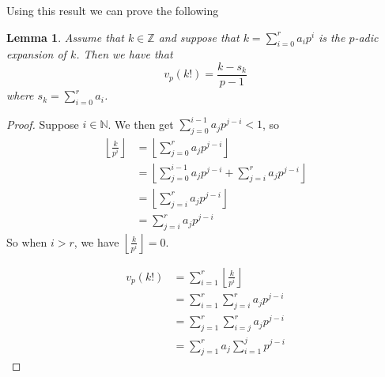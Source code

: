 \documentclass{article}
\newtheorem{lemma}{Lemma}[section]
\newcommand{\mbb}[1]{\mathbb{#1}}
\begin{document}
Using this result we can prove the following

\begin{lemma}
    Assume that $k \in \mbb Z$ and suppose that $k = \sum_{i = 0}^{r} a_i p^i$ is the $p$-adic expansion of $k$. Then we have that 
    $$v_p(k!) = \frac{k - s_k}{p - 1}$$
    where $s_k = \sum_{i = 0}^{r} a_i$.
\end{lemma}
\begin{proof}
    Suppose $i \in \mbb N$. We then get $\sum_{j = 0}^{i-1}a_j p^{j-i} < 1$, so
    \begin{align*}
        \left\lfloor \frac{k}{p^i} \right \rfloor &= \left \lfloor \sum_{j = 0}^{r} a_j p^{j-i} \right \rfloor \\ 
        &= \left \lfloor \sum_{j = 0}^{i-1}a_j p^{j-i} + \sum_{j=i}^{r} a_j p^{j-i} \right \rfloor \\
        &=  \left \lfloor \sum_{j=i}^{r} a_j p^{j-i} \right \rfloor \\
        &= \sum_{j=i}^{r} a_j p^{j-i}
    \end{align*}
    So when $i > r$, we have $\left\lfloor \frac{k}{p^i} \right \rfloor = 0$.
    
    
    \begin{align*}
        v_p(k!) &= \sum_{i = 1}^{r} \left\lfloor \frac{k}{p^i} \right \rfloor \\
        &= \sum_{i = 1}^{r} \sum_{j=i}^{r} a_j p^{j-i} \\ 
        &= \sum_{j=1}^{r} \sum_{i = j}^{r} a_j p^{j-i} \\
        &= \sum_{j=1}^{r} a_j \sum_{i = 1}^{j} p^{j-i}
    \end{align*}


\end{proof}
\end{document}
